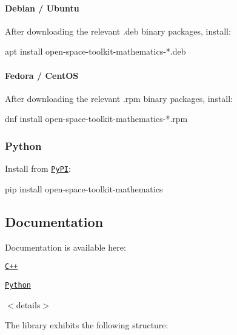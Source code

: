 \paragraph*{Debian / Ubuntu}

After downloading the relevant {\ttfamily .deb} binary packages, install\+:


\begin{DoxyCode}
apt install open-space-toolkit-mathematics-*.deb
\end{DoxyCode}


\paragraph*{Fedora / Cent\+OS}

After downloading the relevant {\ttfamily .rpm} binary packages, install\+:


\begin{DoxyCode}
dnf install open-space-toolkit-mathematics-*.rpm
\end{DoxyCode}


\subsubsection*{Python}

Install from \href{https://pypi.org/project/open-space-toolkit-mathematics/}{\tt Py\+PI}\+:


\begin{DoxyCode}
pip install open-space-toolkit-mathematics
\end{DoxyCode}


\subsection*{Documentation}

Documentation is available here\+:


\begin{DoxyItemize}
\item \href{https://open-space-collective.github.io/open-space-toolkit-mathematics}{\tt C++}
\item \href{./bindings/python/docs}{\tt Python}
\end{DoxyItemize}

$<$details$>$

The library exhibits the following structure\+:


